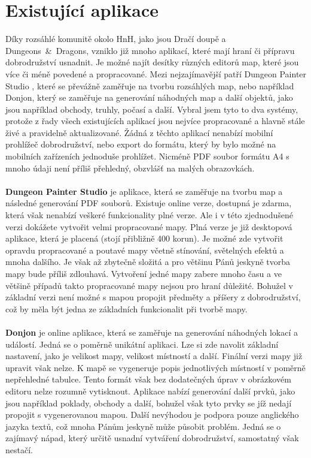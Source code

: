 \documentclass[thesis=B,czech]{resources/FITthesis}[2012/06/26]
\begin{document}
	\section{Existující aplikace}
Díky rozsáhlé komunitě okolo HnH, jako jsou Dračí doupě a Dungeons~\&~Dragons, vzniklo již mnoho aplikací, které mají hraní či přípravu dobrodružství usnadnit. Je možné najít desítky různých editorů map, které jsou více či méně povedené a propracované. Mezi nejzajímavější patří  Dungeon Painter Studio \cite{dungeoPainterStudio}, které se převážně zaměřuje na tvorbu rozsáhlých map, nebo například Donjon\cite{donjon}, který se zaměřuje na generování náhodných map a další objektů, jako jsou například obchody, truhly, počasí a další. Vybral jsem tyto to dva systémy, protože z řady všech existujících aplikací jsou nejvíce propracované a hlavně stále živé a pravidelně aktualizované. Žádná z těchto aplikací nenabízí mobilní prohlížeč dobrodružství, nebo export do formátu, který by bylo možné na mobilních zařízeních jednoduše prohlížet. Nicméně PDF soubor formátu A4 s mnoho údaji není příliš přehledný, obzvlášť na malých obrazovkách. \\
\\
\textbf{Dungeon Painter Studio} je aplikace, která se zaměřuje na tvorbu map a následné generování PDF souborů. Existuje online verze, dostupná je zdarma, která však nenabízí veškeré funkcionality plné verze. Ale i v této zjednodušené verzi dokážete vytvořit velmi propracované mapy. Plná verze je již desktopová aplikace, která je placená (stojí  přibližně 400 korun). Je možné zde vytvořit opravdu propracované a poutavé mapy včetně stínování, světelných efektů a mnoha dalšího. Je však až zbytečně složitá a pro většinu Pánů jeskyně tvorba mapy bude příliš zdlouhavá. Vytvoření jedné mapy zabere mnoho času a ve většině případů takto propracované mapy nejsou pro hraní důležité. Bohužel v základní verzi není možné s mapou propojit předměty a příšery z dobrodružství, což by měla být jedna ze základních funkcionalit při tvorbě mapy.\\
\\
\textbf{Donjon} je online aplikace, která se zaměřuje na generování náhodných lokací a událostí. Jedná se o poměrně unikátní aplikaci. Lze si zde navolit základní nastavení, jako je velikost mapy, velikost místností a další. Finální verzi mapy již upravit však nelze. K mapě se vygeneruje popis jednotlivých místností v poměrně nepřehledné tabulce. Tento formát však bez dodatečných úprav v obrázkovém editoru nelze rozumně vytisknout. Aplikace nabízí generování další prvků, jako jsou například poklady, obchody a další, bohužel však tyto prvky se jíž nedají propojit s vygenerovanou mapou. Další nevýhodou je podpora pouze anglického jazyka textů, což mnoha Pánům jeskyně může působit problém. Jedná se o zajímavý nápad, který určitě usnadní vytváření dobrodružství, samostatný však nestačí.
\end{document}
